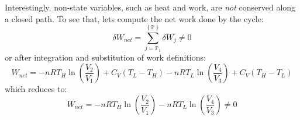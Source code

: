 \documentclass[11pt]{article}
\theoremstyle{definition}
\begin{document}
Interestingly, non-state variables, such as heat and work, are \textit{not} conserved along a closed path. To see that, lets compute the
net work done by the cycle:
\begin{equation}
\delta{W}_{net} = \sum_{j=\mathbb{P}_{1}}^{\left\{\mathbb{P}\right\}}\delta{W}_j\neq 0
\end{equation}or after integration and substitution of work definitions:
\begin{equation}
W_{net} = - nRT_{H}\ln\left(\frac{V_{2}}{V_{1}}\right) + C_{V}\left(T_{L} - T_{H}\right) - nRT_{L}\ln\left(\frac{V_{4}}{V_{3}}\right) + C_{V}\left(T_{H} - T_{L}\right)
\end{equation}which reduces to:
\begin{equation}
W_{net} = - nRT_{H}\ln\left(\frac{V_{2}}{V_{1}}\right) - nRT_{L}\ln\left(\frac{V_{4}}{V_{3}}\right) \neq{0}
\end{equation}





\end{document}
